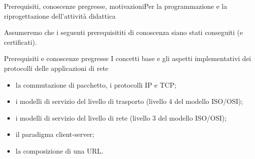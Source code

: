 \documentclass[italian]{beamer}
\begin{document}
\begin{frame}[allowframebreaks]{Prerequisiti, conoscenze pregresse, motivazioni}{Per la programmazione e la riprogettazione dell'attivit\`a didattica}

	
	
	Assumeremo che i seguenti prerequisititi di conoscenza siano stati conseguiti (e certificati).
		
	\begin{block}{Prerequisiti e conoscenze pregresse}
		I concetti base e gli aspetti implementativi dei protocolli delle applicazioni di rete
		
		\begin{itemize}
			\item la commutazione di pacchetto, i protocolli IP e TCP;
			\item i modelli di servizio del livello di trasporto (livello 4 del modello ISO/OSI);
			\item i modelli di servizio del livello di rete (livello 3 del modello ISO/OSI);
			\item il paradigma client-server;
			\item la composizione di una URL.
		\end{itemize}
	\end{block}
	
		
		
	
	

		

\end{frame}
\end{document}
